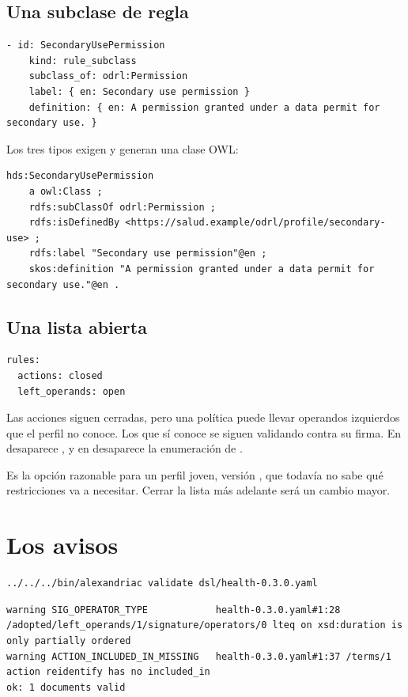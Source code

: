 \subsection{Una subclase de regla}

\begin{lstlisting}[style=yaml]
  - id: SecondaryUsePermission
    kind: rule_subclass
    subclass_of: odrl:Permission
    label: { en: Secondary use permission }
    definition: { en: A permission granted under a data permit for secondary use. }
\end{lstlisting}

Los tres tipos  exigen  y generan una clase OWL:

\begin{lstlisting}[style=ttl]
hds:SecondaryUsePermission
    a owl:Class ;
    rdfs:subClassOf odrl:Permission ;
    rdfs:isDefinedBy <https://salud.example/odrl/profile/secondary-use> ;
    rdfs:label "Secondary use permission"@en ;
    skos:definition "A permission granted under a data permit for secondary use."@en .
\end{lstlisting}

\subsection{Una lista abierta}

\begin{lstlisting}[style=yaml]
rules:
  actions: closed
  left_operands: open
\end{lstlisting}

Las acciones siguen cerradas, pero una política puede llevar operandos izquierdos que el perfil no conoce. Los
que sí conoce se siguen validando contra su firma. En  desaparece , y
en  desaparece la enumeración de .

Es la opción razonable para un perfil joven, versión , que todavía no sabe qué restricciones va a
necesitar. Cerrar la lista más adelante será un cambio mayor.

\section{Los avisos}

\begin{lstlisting}[style=sh]
../../../bin/alexandriac validate dsl/health-0.3.0.yaml
\end{lstlisting}
\begin{lstlisting}[style=out]
warning SIG_OPERATOR_TYPE            health-0.3.0.yaml#1:28 /adopted/left_operands/1/signature/operators/0 lteq on xsd:duration is only partially ordered
warning ACTION_INCLUDED_IN_MISSING   health-0.3.0.yaml#1:37 /terms/1 action reidentify has no included_in
ok: 1 documents valid
\end{lstlisting}

